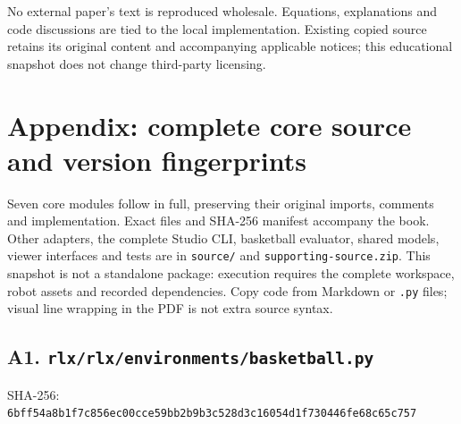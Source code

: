 \documentclass[
  american,
  11pt,
  letterpaper,
]{article}
\begin{document}
No external paper's text is reproduced wholesale. Equations,
explanations and code discussions are tied to the local implementation.
Existing copied source retains its original content and accompanying
applicable notices; this educational snapshot does not change
third-party licensing.

\section{Appendix: complete core source and version
fingerprints}\label{appendix-complete-core-source-and-version-fingerprints}

Seven core modules follow in full, preserving their original imports,
comments and implementation. Exact files and SHA-256 manifest accompany
the book. Other adapters, the complete Studio CLI, basketball evaluator,
shared models, viewer interfaces and tests are in \texttt{source/} and
\texttt{supporti\allowbreak{}ng-\allowbreak{}source.z\allowbreak{}ip}.
This snapshot is not a standalone package: execution requires the
complete workspace, robot assets and recorded dependencies. Copy code
from Markdown or \texttt{.py} files; visual line wrapping in the PDF is
not extra source syntax.

\subsection{\texorpdfstring{A1.
\texttt{rlx/\allowbreak{}rlx/\allowbreak{}environm\allowbreak{}ents/\allowbreak{}basketba\allowbreak{}ll.py}}{A1. }}\label{a1.-rlxrlxenvironmentsbasketball.py}

SHA-256:
\texttt{6bff54a8\allowbreak{}b1f7c856\allowbreak{}ec00cce5\allowbreak{}9bb2b9b3\allowbreak{}c528d3c1\allowbreak{}6054d1f7\allowbreak{}30446fe6\allowbreak{}8c65c757\allowbreak{}}
\end{document}
